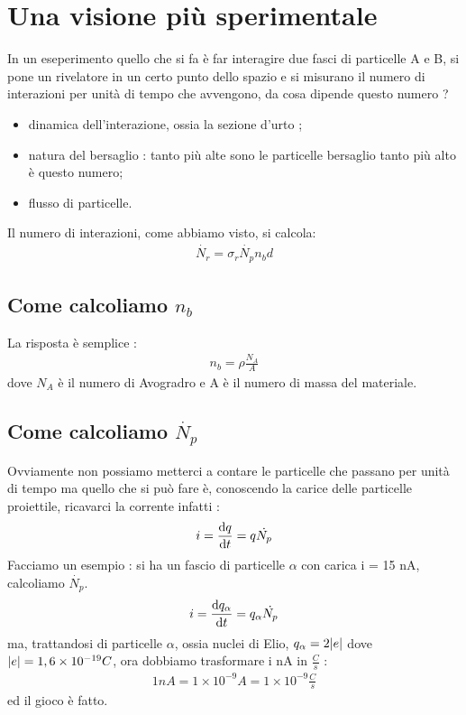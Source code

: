 \section{Una visione più sperimentale}
In un eseperimento quello che si fa è far interagire due fasci di particelle A e B, si pone 
un rivelatore in un certo punto dello spazio e si misurano il numero di interazioni per unità di tempo
che avvengono, da cosa dipende questo numero ? 
\begin{itemize}
        \item dinamica dell'interazione, ossia la sezione d'urto ;
        \item natura del bersaglio : tanto più alte sono le particelle bersaglio tanto 
                più alto è questo numero;
        \item flusso di particelle.
\end{itemize}
Il numero di interazioni, come abbiamo visto, si calcola:
\begin{align*}
    \dot{N_{r}} = \sigma_{r}\dot{N_{p}}n_{b}d
\end{align*}
\subsection{Come calcoliamo $n_{b}$}
La risposta è semplice : 
\begin{align*}
        n_{b} = \rho\frac{N_{A}}{A}
\end{align*}
dove $N_{A}$ è il numero di Avogradro e A è il numero di massa del materiale.
\subsection{Come calcoliamo $\dot{N_{p}}$}
Ovviamente non possiamo metterci a contare le particelle che passano per unità di tempo 
ma quello che si può fare è, conoscendo la carice delle particelle proiettile, ricavarci la 
corrente infatti : 
\begin{align*}
    i = \dv{q}{t} = q\dot{N_{p}}
\end{align*}
Facciamo un esempio : si ha un fascio di particelle $\alpha$ con carica i = 15 nA, calcoliamo 
$\dot{N_{p}}$. \\
\begin{align*}
        i = \dv{q_{\alpha}}{t} = q_{\alpha}\dot{N_{p}}
\end{align*}
ma, trattandosi di particelle $\alpha$, ossia nuclei di Elio, $q_{\alpha} = 2\abs{e}$ 
dove $\abs{e} = 1,6\times10^{-19}C$, ora dobbiamo trasformare i nA in $\frac{C}{s}$ : 
\begin{align*}
    1nA = 1\times10^{-9}A = 1\times10^{-9}\frac{C}{s}
\end{align*}
ed il gioco è fatto.
\newpage
